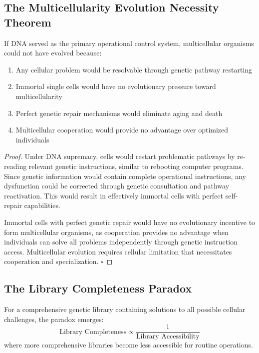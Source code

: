 \documentclass[11pt,a4paper]{article}
\begin{document}
\subsection{The Multicellularity Evolution Necessity Theorem}

\begin{theorem}
If DNA served as the primary operational control system, multicellular organisms could not have evolved because:
\begin{enumerate}
\item Any cellular problem would be resolvable through genetic pathway restarting
\item Immortal single cells would have no evolutionary pressure toward multicellularity  
\item Perfect genetic repair mechanisms would eliminate aging and death
\item Multicellular cooperation would provide no advantage over optimized individuals
\end{enumerate}
\end{theorem}

\begin{proof}
Under DNA supremacy, cells would restart problematic pathways by re-reading relevant genetic instructions, similar to rebooting computer programs. Since genetic information would contain complete operational instructions, any dysfunction could be corrected through genetic consultation and pathway reactivation. This would result in effectively immortal cells with perfect self-repair capabilities.

Immortal cells with perfect genetic repair would have no evolutionary incentive to form multicellular organisms, as cooperation provides no advantage when individuals can solve all problems independently through genetic instruction access. Multicellular evolution requires cellular limitation that necessitates cooperation and specialization. $\square$
\end{proof}

\subsection{The Library Completeness Paradox}

\begin{definition}
For a comprehensive genetic library containing solutions to all possible cellular challenges, the paradox emerges:
\begin{equation}
\text{Library Completeness} \propto \frac{1}{\text{Library Accessibility}}
\end{equation}
where more comprehensive libraries become less accessible for routine operations.
\end{definition}
\end{document}
